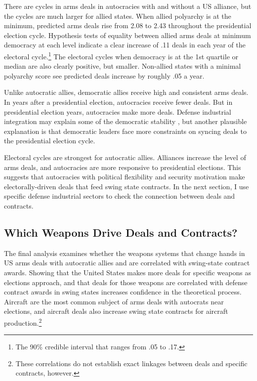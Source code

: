 \documentclass[12pt]{article}
\begin{document}
There are cycles in arms deals in autocracies with and without a US alliance, but the cycles are much larger for allied states. 
When allied polyarchy is at the minimum, predicted arms deals rise from 2.08 to 2.43 throughout the presidential election cycle.
Hypothesis tests of equality between allied arms deals at minimum democracy at each level indicate a clear increase of .11 deals in each year of the electoral cycle.\footnote{The 90\% credible interval that ranges from .05 to .17.}
The electoral cycles when democracy is at the 1st quartile or median are also clearly positive, but smaller.
Non-allied states with a minimal polyarchy score see predicted deals increase by roughly .05 a year.


Unlike autocratic allies, democratic allies receive high and consistent arms deals.
In years after a presidential election, autocracies receive fewer deals. 
But in presidential election years, autocracies make more deals.
Defense industrial integration may explain some of the democratic stability \citep{Brooks2005}, but another plausible explanation is that democratic leaders face more constraints on syncing deals to the presidential election cycle.


Electoral cycles are strongest for autocratic allies. 
Alliances increase the level of arms deals, and autocracies are more responsive to presidential elections. 
This suggests that autocracies with political flexibility and security motivation make electorally-driven deals that feed swing state contracts. 
In the next section, I use specific defense industrial sectors to check the connection between deals and contracts. 



\subsection{Which Weapons Drive Deals and Contracts?} 


The final analysis examines whether the weapons systems that change hands in US arms deals with autocratic allies and are correlated with swing-state contract awards. 
Showing that the United States makes more deals for specific weapons as elections approach, and that deals for those weapons are correlated with defense contract awards in swing states increases confidence in the theoretical process. 
Aircraft are the most common subject of arms deals with autocrats near elections, and aircraft deals also increase swing state contracts for aircraft production.\footnote{These correlations do not establish exact linkages between deals and specific contracts, however.}
\end{document}
